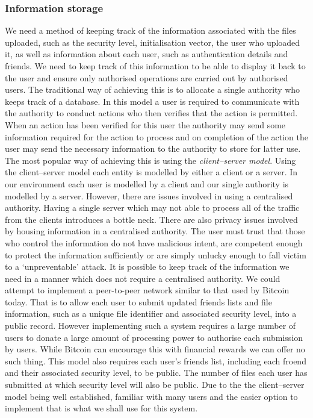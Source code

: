 \documentclass[12pt, titlepage]{article}
\begin{document}
\subsubsection{Information storage}
We need a method of keeping track of the information associated with the files uploaded, such as the security level, initialisation vector, the user who uploaded it, as well as information about each user, such as authentication details and friends. We need to keep track of this information to be able to display it back to the user and ensure only authorised operations are carried out by authorised users.
\newline \indent The traditional way of achieving this is to allocate a single authority who keeps track of a database. In this model a user is required to communicate with the authority to conduct actions who then verifies that the action is permitted. When an action has been verified for this user the authority may send some information required for the action to process and on completion of the action the user may send the necessary information to the authority to store for latter use. The most popular way of achieving this is using the \textit{client–server model}. Using the client–server model each entity is modelled by either a client or a server. In our environment each user is modelled by a client and our single authority is modelled by a server. However, there are issues involved in using a centralised authority. Having a single server which may not able to process all of the traffic from the clients introduces a bottle neck. There are also privacy issues involved by housing information in a centralised authority. The user must trust that those who control the information do not have malicious intent, are competent enough to protect the information sufficiently or are simply unlucky enough to fall victim to a `unpreventable' attack.  
\newline \indent It is possible to keep track of the information we need in a manner which does not require a centralised authority. We could attempt to implement a peer-to-peer network similar to that used by Bitcoin today. That is to allow each user to submit updated friends lists and file information, such as a unique file identifier and associated security level, into a public record. However implementing such a system requires a large number of users to donate a large amount of processing power to authorise each submission by users. While Bitcoin can encourage this with financial rewards we can offer no such thing. This model also requires each user's friends list, including each froend and their associated security level, to be public. The number of files each user has submitted at which security level will also be public.
\newline \indent Due to the the client–server model being well established, familiar with many users and the easier option to implement that is what we shall use for this system.
\end{document}
